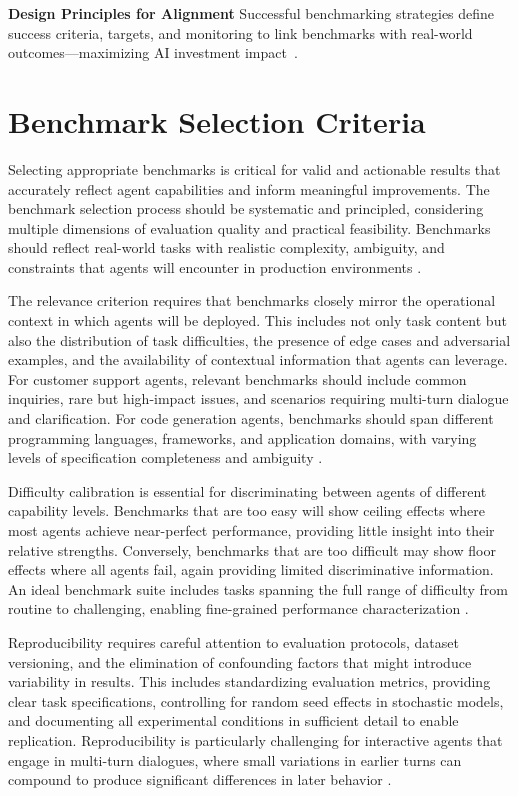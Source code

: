 \begin{TNtwocol}
\textbf{Design Principles for Alignment}
Successful benchmarking strategies define success criteria, targets, and monitoring to link benchmarks with real-world outcomes---maximizing AI investment impact~\cite{deeplearningai2024,liu2023,kiela2021}.

\section{Benchmark Selection Criteria}
Selecting appropriate benchmarks is critical for valid and actionable results that accurately reflect agent capabilities and inform meaningful improvements. The benchmark selection process should be systematic and principled, considering multiple dimensions of evaluation quality and practical feasibility. Benchmarks should reflect real-world tasks with realistic complexity, ambiguity, and constraints that agents will encounter in production environments \cite{liang2023,kiela2021,googlecloud2024}.

The relevance criterion requires that benchmarks closely mirror the operational context in which agents will be deployed. This includes not only task content but also the distribution of task difficulties, the presence of edge cases and adversarial examples, and the availability of contextual information that agents can leverage. For customer support agents, relevant benchmarks should include common inquiries, rare but high-impact issues, and scenarios requiring multi-turn dialogue and clarification. For code generation agents, benchmarks should span different programming languages, frameworks, and application domains, with varying levels of specification completeness and ambiguity \cite{jimenez2024}.

Difficulty calibration is essential for discriminating between agents of different capability levels. Benchmarks that are too easy will show ceiling effects where most agents achieve near-perfect performance, providing little insight into their relative strengths. Conversely, benchmarks that are too difficult may show floor effects where all agents fail, again providing limited discriminative information. An ideal benchmark suite includes tasks spanning the full range of difficulty from routine to challenging, enabling fine-grained performance characterization \cite{kiela2021,liang2023}.

Reproducibility requires careful attention to evaluation protocols, dataset versioning, and the elimination of confounding factors that might introduce variability in results. This includes standardizing evaluation metrics, providing clear task specifications, controlling for random seed effects in stochastic models, and documenting all experimental conditions in sufficient detail to enable replication. Reproducibility is particularly challenging for interactive agents that engage in multi-turn dialogues, where small variations in earlier turns can compound to produce significant differences in later behavior \cite{kiela2021,dror2018,reimers2017}.


\end{TNtwocol}
